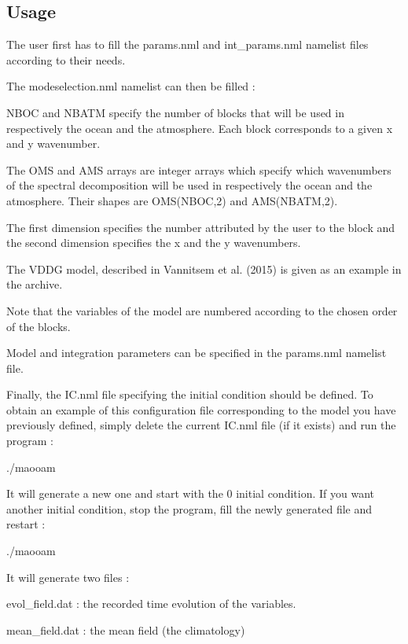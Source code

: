 \subsection*{Usage}

The user first has to fill the params.\-nml and int\-\_\-params.\-nml namelist files according to their needs.

The modeselection.\-nml namelist can then be filled \-:
\begin{DoxyItemize}
\item N\-B\-O\-C and N\-B\-A\-T\-M specify the number of blocks that will be used in respectively the ocean and the atmosphere. Each block corresponds to a given x and y wavenumber.
\item The O\-M\-S and A\-M\-S arrays are integer arrays which specify which wavenumbers of the spectral decomposition will be used in respectively the ocean and the atmosphere. Their shapes are O\-M\-S(\-N\-B\-O\-C,2) and A\-M\-S(\-N\-B\-A\-T\-M,2).
\item The first dimension specifies the number attributed by the user to the block and the second dimension specifies the x and the y wavenumbers.
\item The V\-D\-D\-G model, described in Vannitsem et al. (2015) is given as an example in the archive.
\item Note that the variables of the model are numbered according to the chosen order of the blocks.
\end{DoxyItemize}

Model and integration parameters can be specified in the params.\-nml namelist file.

Finally, the I\-C.\-nml file specifying the initial condition should be defined. To obtain an example of this configuration file corresponding to the model you have previously defined, simply delete the current I\-C.\-nml file (if it exists) and run the program \-: \begin{DoxyVerb}./maooam
\end{DoxyVerb}


It will generate a new one and start with the 0 initial condition. If you want another initial condition, stop the program, fill the newly generated file and restart \-: \begin{DoxyVerb}./maooam
\end{DoxyVerb}


It will generate two files \-:
\begin{DoxyItemize}
\item evol\-\_\-field.\-dat \-: the recorded time evolution of the variables.
\item mean\-\_\-field.\-dat \-: the mean field (the climatology)
\end{DoxyItemize}

